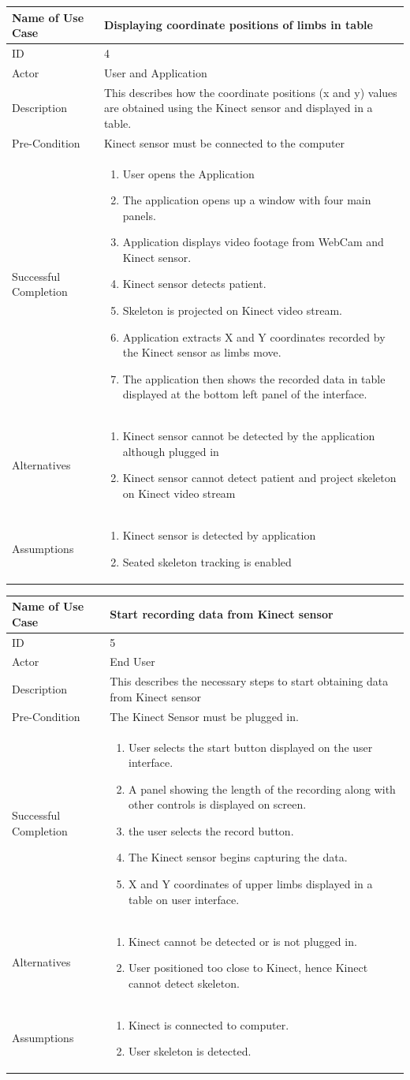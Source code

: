 \documentclass[a4paper, 12pt]{article}
\newcommand\addrow[2]{#1 &#2\\ }
\newcommand\addheading[2]{#1 &#2\\ \hline}
\newcommand\tabularhead{\begin{tabular}{lp{8cm}}
\hline
}
\newcommand\addmulrow[2]{ \begin{minipage}[t][][t]{2.5cm}#1\end{minipage}%
   &\begin{minipage}[t][][t]{8cm}
    \begin{enumerate} #2   \end{enumerate}
    \end{minipage}\\ }
\newenvironment{usecase}{\tabularhead}
{\hline\end{tabular}}
\begin{document}
\begin{usecase}
	\addheading{Name of Use Case}{Displaying coordinate positions of limbs in table}
	\addrow{ID}{4}
	\addrow{Actor}{User and Application}
	\addrow{Description}{This describes how the coordinate positions (x and y) values are obtained using the Kinect sensor and displayed in a table.}
	\addrow{Pre-Condition}{Kinect sensor must be connected to the computer}
	\addmulrow{Successful Completion}{
		\item User opens the Application
		\item The application opens up a window with four main panels. 
		\item Application displays video footage from WebCam and Kinect sensor.
		\item Kinect sensor detects patient.  
		\item Skeleton is projected on Kinect video stream.
		\item Application extracts X and Y coordinates recorded by the Kinect sensor as limbs move.  
		\item The application then shows the recorded data in table displayed at the bottom left panel of the interface.}
	\addmulrow{Alternatives}{
	\item Kinect sensor cannot be detected by the application although plugged in
	\item Kinect sensor cannot detect patient and project skeleton on Kinect video stream}
	\addmulrow{Assumptions}{
	\item Kinect sensor is detected by application 
	\item Seated skeleton tracking is enabled}
\end{usecase}


\begin{usecase}
	\addheading{Name of Use Case}{Start recording data from Kinect sensor}
	\addrow{ID}{5}
	\addrow{Actor}{End User}
	\addrow{Description}{This describes the necessary steps to start obtaining data from Kinect sensor}
	\addrow{Pre-Condition}{The Kinect Sensor must be plugged in.}
	\addmulrow{Successful Completion}{
		\item User selects the start button displayed on the user interface. 
		\item A panel showing the length of the recording along with other controls is displayed on screen.
		\item the user selects the record button.
		\item The Kinect sensor begins capturing the data. 
		\item X and Y coordinates of upper limbs displayed in a table on user interface.}
	\addmulrow{Alternatives}{ 
	\item Kinect cannot be detected or is not plugged in.
	\item User positioned too close to Kinect, hence Kinect cannot detect skeleton.}
	\addmulrow{Assumptions}{
	\item Kinect is connected to computer. 
	\item User skeleton is detected.}
\end{usecase}
\end{document}
